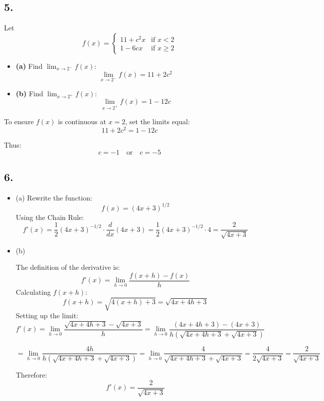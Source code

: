 \documentclass[a4paper, 7pt]{article}
\begin{document}
\subsection*{5.}

Let 
\[
f(x) = 
\begin{cases} 
11 + c^2 x & \text{if } x < 2 \\ 
1 - 6c x & \text{if } x \geq 2 
\end{cases}
\]

\begin{itemize}
    \item \textbf{(a)} Find \( \lim_{x \to 2^-} f(x) \):
    \[
    \lim_{x \to 2^-} f(x) = 11 + 2c^2
    \]
    
    \item \textbf{(b)} Find \( \lim_{x \to 2^+} f(x) \):
    \[
    \lim_{x \to 2^+} f(x) = 1 - 12c
    \]
\end{itemize}

To ensure \( f(x) \) is continuous at \( x = 2 \), set the limits equal:
\[
11 + 2c^2 = 1 - 12c
\]

Thus:
\[
c = -1 \quad \text{or} \quad c = -5
\]

\subsection*{6.}
\begin {itemize}
    \item (a)
    Rewrite the function:
    \[
    f(x) = (4x + 3)^{1/2}
    \]
    Using the Chain Rule:
    \[
    f'(x) = \frac{1}{2}(4x + 3)^{-1/2} \cdot \frac{d}{dx}(4x + 3)
    = \frac{1}{2}(4x + 3)^{-1/2} \cdot 4 = \frac{2}{\sqrt{4x + 3}}
    \]
    \item (b)

    The definition of the derivative is:
    \[
    f'(x) = \lim_{h \to 0} \frac{f(x + h) - f(x)}{h}
    \]
    Calculating \( f(x + h) \):
    \[
    f(x + h) = \sqrt{4(x + h) + 3} = \sqrt{4x + 4h + 3}
    \]
    Setting up the limit:
    \[
    f'(x) = \lim_{h \to 0} \frac{\sqrt{4x + 4h + 3} - \sqrt{4x + 3}}{h} = \lim_{h \to 0} \frac{(4x + 4h + 3) - (4x + 3)}{h \left(\sqrt{4x + 4h + 3} + \sqrt{4x + 3}\right)}
    \]

    \[
    = \lim_{h \to 0} \frac{4h}{h \left(\sqrt{4x + 4h + 3} + \sqrt{4x + 3}\right)} = \lim_{h \to 0} \frac{4}{\sqrt{4x + 4h + 3} + \sqrt{4x + 3}} = \frac{4}{2\sqrt{4x + 3}} = \frac{2}{\sqrt{4x + 3}}
    \]

    Therefore:
    \[
    f'(x) = \frac{2}{\sqrt{4x + 3}}
    \]
\end{itemize}
\end{document}
